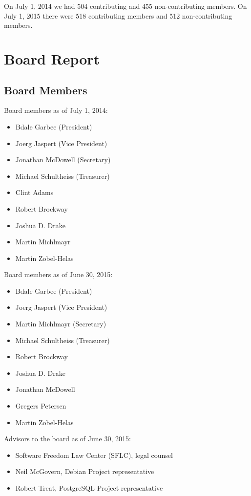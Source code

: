 \documentclass[letterpaper]{report}
\begin{document}
On July 1, 2014 we had 504 contributing and 455 non-contributing members.
On July 1, 2015 there were 518 contributing members and 512 non-contributing
members.


\chapter{Board Report}
\section{Board Members}

Board members as of July 1, 2014:

\begin{itemize}
\item Bdale Garbee (President)
\item Joerg Jaspert (Vice President)
\item Jonathan McDowell (Secretary)
\item Michael Schultheiss (Treasurer)
\item Clint Adams
\item Robert Brockway
\item Joshua D. Drake
\item Martin Michlmayr
\item Martin Zobel-Helas
\end{itemize}

Board members as of June 30, 2015:

\begin{itemize}
\item Bdale Garbee (President)
\item Joerg Jaspert (Vice President)
\item Martin Michlmayr (Secretary)
\item Michael Schultheiss (Treasurer)
\item Robert Brockway
\item Joshua D. Drake
\item Jonathan McDowell
\item Gregers Petersen
\item Martin Zobel-Helas
\end{itemize}

Advisors to the board as of June 30, 2015:

\begin{itemize}
\item Software Freedom Law Center (SFLC), legal counsel
\item Neil McGovern, Debian Project representative
\item Robert Treat, PostgreSQL Project representative
\end{itemize}
\end{document}
